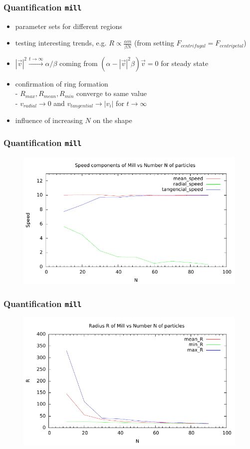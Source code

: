 \documentclass[compress]{beamer}
\begin{document}
\begin{frame}
	\frametitle{Quantification \texttt{mill}}
	\begin{itemize}
		\item parameter sets for different regions
		\item testing interesting trends, e.g. \( R \propto \frac{\alpha m}{\beta N}\) (from setting \( F_{centrifugal} = F_{centripetal} \))
		\item \( |\vec{v}|^{2} \xrightarrow{t \to \infty}  \alpha / \beta \) coming from \( (\alpha - |\vec{v}|^2 \beta ) \vec{v} = 0 \) for steady state
		\item confirmation of ring formation \\
		- \( R_{max}, R_{mean}, R_{min} \) converge to same value \\
		- \( v_{radial} \to 0 \) and \( v_{tangential} \to | v_{i} |  \) for \( t \to \infty \)
		\item influence of increasing \( N \) on the shape
	\end{itemize}
\end{frame}


\begin{frame}
	\frametitle{Quantification \texttt{mill}}
	\begin{figure}[H]
		\includegraphics[width=1. \columnwidth]{../plots/mill_II_speeds_N.pdf}
	\end{figure}	
\end{frame}


\begin{frame}
	\frametitle{Quantification \texttt{mill}}
	
\begin{figure}[H]
		\includegraphics[width=1. \columnwidth]{../plots/mill_II_radius_N.pdf}
\end{figure}

\end{frame}
\end{document}

